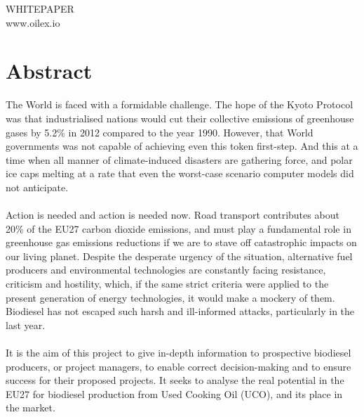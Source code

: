 \documentclass[11pt,fleqn]{book} %
\begin{document}

\begingroup
\thispagestyle{empty}
\vfill
\vfill
\begin{center}
	\color{darkgoldenrod} \LARGE WHITEPAPER \\
	\color{darkgoldenrod} \large www.oilex.io
\end{center}
\endgroup

\newpage
\section{Abstract}
The World is faced with a formidable challenge. The hope of the Kyoto Protocol was that
industrialised nations would cut their collective emissions of greenhouse gases by 5.2\% in
2012 compared to the year 1990. However, that World governments was not capable of achieving 
even this token first-step. And this at a time when all manner of
climate-induced disasters are gathering force, and polar ice caps melting at a rate that even
the worst-case scenario computer models did not anticipate.\\\\
Action is needed and action is needed now. Road transport contributes about 20\% of the
EU27 carbon dioxide emissions, and must play a fundamental role in greenhouse gas
emissions reductions if we are to stave off catastrophic impacts on our living planet. Despite
the desperate urgency of the situation, alternative fuel producers and environmental
technologies are constantly facing resistance, criticism and hostility, which, if the same strict
criteria were applied to the present generation of energy technologies, it would make a
mockery of them. Biodiesel has not escaped such harsh and ill-informed attacks, particularly
in the last year.\\\\
It is the aim of this project to give in-depth information to prospective biodiesel producers,
or project managers, to enable correct decision-making and to ensure success for their
proposed projects. It seeks to analyse the real potential in the EU27 for biodiesel production
from Used Cooking Oil (UCO), and its place in the market.
\end{document}

